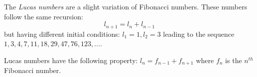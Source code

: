 \documentclass{article}
\begin{document}
The \emph{Lucas numbers} are a slight variation of Fibonacci numbers. 
These numbers follow the same recursion:
$$l_{n+1}=l_n + l_{n-1}$$
but having different initial conditions: $l_1=1, l_2=3$ leading to the sequence
$1, 3, 4, 7, 11, 18, 29, 47, 76, 123,\ldots$.

Lucas numbers have the following property: $l_n=f_{n-1}+f_{n+1}$ where $f_n$ is the $n^{th}$ Fibonacci number.
\end{document}
